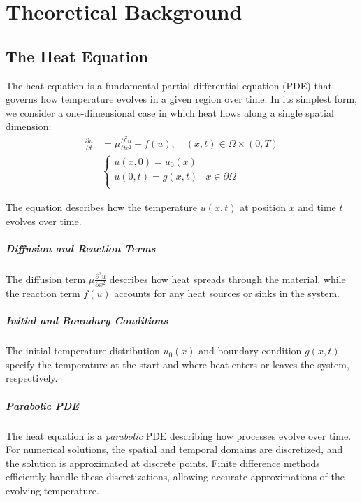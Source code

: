 \chapter{Theoretical Background}

\section{The Heat Equation}

The heat equation is a fundamental partial differential equation (PDE) that governs how temperature evolves in a given region over time. In its simplest form, we consider a one-dimensional case in which heat flows along a single spatial dimension:
\begin{align*}
  \frac{\partial u}{\partial t} & = \mu \frac{\partial^2 u}{\partial x^2} + f(u), \quad \left( x, t \right) \in \Omega \times \left(0, T\right) \tag{PDE} \\
                                &
  \begin{cases}
    u(x, 0) = u_0(x)  &                       \\
    u(0, t) = g(x, t) & x \in \partial \Omega \\
  \end{cases} \tag{BC}
\end{align*}\label{eq:heat_eq}

The equation describes how the temperature $u(x, t)$ at position $x$ and time $t$ evolves over time.

\paragraph{Diffusion and Reaction Terms}
The diffusion term $\mu \frac{\partial^2 u}{\partial x^2}$ describes how heat spreads through the material, while the reaction term $f(u)$ accounts for any heat sources or sinks in the system.

\paragraph{Initial and Boundary Conditions}
The initial temperature distribution $u_0(x)$ and boundary condition $g(x, t)$ specify the temperature at the start and where heat enters or leaves the system, respectively.

\paragraph{Parabolic PDE}
The heat equation is a \emph{parabolic} PDE describing how processes evolve over time. For numerical solutions, the spatial and temporal domains are discretized, and the solution is approximated at discrete points. Finite difference methods efficiently handle these discretizations, allowing accurate approximations of the evolving temperature.

